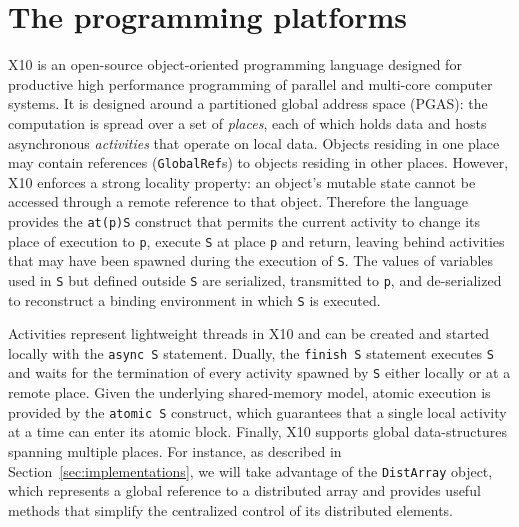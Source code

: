 \documentclass[a4paper]{article}
\numberwithin{equation}{section}
\begin{document}
\section{The programming platforms}\label{sec:platforms}

X10\cite{Ebcioglu04x10:programming,Charles:2005:XOA:1094811.1094852} 
is an open-source object-oriented programming language designed 
for productive high performance programming of parallel and 
multi-core computer systems.
It is designed around a partitioned global address space (PGAS): 
the computation is spread over a set of \emph{places}, each of which
holds data and hosts asynchronous \emph{activities} that operate on
local data. Objects residing in one place may contain references
(\verb+GlobalRef+s) to objects residing in other places. However, X10
enforces a strong locality property: an object's mutable state
cannot be accessed through a remote reference to that
object. Therefore the language provides the {\tt at(p)S} construct 
that permits the current activity to change its place of execution to
{\tt p}, execute {\tt S} at place {\tt p} and return, leaving behind
activities that may have been spawned during the execution of {\tt S}.
The values of variables used in {\tt S} but defined outside {\tt S}
are serialized, transmitted to {\tt p}, and de-serialized to
reconstruct a binding environment in which {\tt S} is executed.

Activities represent lightweight threads in X10 and can be created and
started locally with the {\tt async S} statement. 
Dually, the {\tt finish S} statement executes {\tt S} and waits
for the termination of every activity spawned by {\tt S} either
locally or at a remote place.
Given the underlying shared-memory model, atomic execution is provided
by the \verb+atomic S+ construct, which guarantees
that a single local activity at a time can enter
its atomic block.
Finally, X10 supports global data-structures spanning multiple
places. For instance, as described in
Section~\ref{sec:implementations}, we will take advantage of the
\verb+DistArray+ object, which represents  
a global reference to a distributed array and provides useful methods
that simplify the centralized control of its distributed elements. 
\end{document}
